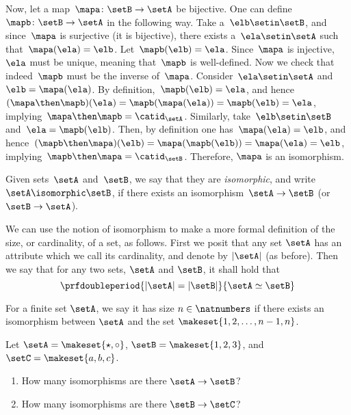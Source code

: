 \begin{solution}
    Now, let a map~$\mapa\colon \setB \to \setA$ be bijective.
    One can define~$\mapb\colon \setB\to \setA$ in the following way.
    Take a~$\elb\setin\setB$, and since~$\mapa$ is surjective (it is bijective), there exists a~$\ela\setin\setA$ such that~$\mapa(\ela)=\elb$.
    Let~$\mapb(\elb)=\ela$.
    Since~$\mapa$ is injective,~$\ela$ must be unique, meaning that~$\mapb$ is well-defined.
    Now we check that indeed~$\mapb$ must be the inverse of~$\mapa$.
    Consider~$\ela \setin\setA$ and~$\elb=\mapa(\ela)$.
    By definition,~$\mapb(\elb)=\ela$, and hence~$(\mapa\then \mapb)(\ela)=\mapb(\mapa(\ela))=\mapb(\elb)=\ela$, implying~$\mapa\then \mapb=\catid_\setA$.
    Similarly, take~$\elb\setin\setB$ and~$\ela=\mapb(\elb)$.
    Then, by definition one has~$\mapa(\ela)=\elb$, and hence~$(\mapb\then \mapa)(\elb)=\mapa(\mapb(\elb))=\mapa(\ela)=\elb$, implying~$\mapb\then \mapa=\catid_\setB$.
    Therefore, $\mapa$ is an isomorphism.
\end{solution}

\begin{definition}
    Given sets~$\setA$ and~$\setB$, we say that they are \emph{isomorphic}, and write~$\setA \isomorphic \setB$,
    if there exists an isomorphism~$\setA \to \setB$ (or~$\setB \to \setA$).
\end{definition}

We can use the notion of isomorphism to make a more formal definition of the size, or cardinality, of a set, as follows.
First we posit that any set $\setA$ has an attribute which we call its cardinality, and denote by $\vert \setA \vert$ (as before).
Then we say that for any two sets, $\setA$ and $\setB$, it shall hold that
\begin{equation}
    \prfdoubleperiod{ \vert \setA \vert = \vert \setB \vert }{ \setA \simeq \setB }
\end{equation}

For a finite set $\setA$, we say it has size $n \in \natnumbers$ if there exists an isomorphism between $\setA$ and the set $\makeset{1,2, \dots, n-1, n}$.

\begin{gradedexercise}
    \label{ex:CountingIsos}

    Let $\setA = \makeset{\star, \circ }$, $\setB = \makeset{1, 2, 3}$, and $\setC = \makeset{a, b, c}$.
    \begin{enumerate}
        \item How many isomorphisms are there $\setA \to \setB$?
        \item How many isomorphisms are there $\setB \to \setC$?
    \end{enumerate}
\end{gradedexercise}

